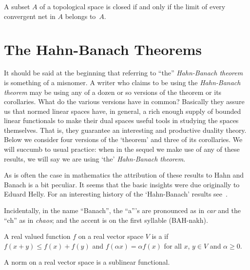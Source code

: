 \begin{cor} A subset $A$ of a topological space is closed if and only if the limit of every convergent net in $A$ belongs to~$A$.
\end{cor}


















\section{The Hahn-Banach Theorems}

It should be said at the beginning that referring to ``the'' \emph{Hahn-Banach theorem} is something of a misnomer.
A writer who claims to be using the \emph{Hahn-Banach theorem} may be using any of a dozen or so versions of the
theorem or its corollaries.  What do the various versions have in common?  Basically they assure us that normed
linear spaces have, in general, a rich enough supply of bounded linear functionals to make their dual spaces useful
tools in studying the spaces themselves. That is, they guarantee an interesting and productive duality theory.
Below we consider four versions of the `theorem' and three of its corollaries.  We will succumb to usual practice:
when in the sequel we make use of any of these results, we will say we are using `the' \emph{Hahn-Banach theorem}.

As is often the case in mathematics the attribution of these results to Hahn and Banach is a bit peculiar.  It seems
that the basic insights were due originally to Eduard Helly.  For an interesting history of the `Hahn-Banach' results
see~\cite{Hochstadt:1980}.

Incidentally, in the name ``Banach'', the ``a'''s are pronounced as in \emph{car} and the ``ch'' as in \emph{chaos};
and the accent is on the first syllable (BAH-nakh).

\begin{defn} A real valued function $f$ on a real vector space $V$ is a
 if $f(x + y) \le f(x) + f(y)$ and $f(\alpha x) = \alpha f(x)$
for all $x$, $y \in V$ and $\alpha \ge 0$.
\end{defn}

\begin{exam} A norm on a real vector space is a sublinear functional.
\end{exam}

